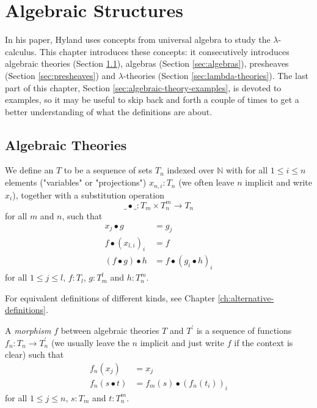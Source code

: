 \chapter{Algebraic Structures}\label{ch:algebraic-structures}

In his paper, Hyland uses concepts from universal algebra to study the $ \lambda $-calculus. This chapter introduces these concepts: it consecutively introduces algebraic theories (Section \ref{sec:algebraic-theories}), algebras (Section \ref{sec:algebras}), presheaves (Section \ref{sec:presheaves}) and $ \lambda $-theories (Section \ref{sec:lambda-theories}). The last part of this chapter, Section \ref{sec:algebraic-theory-examples}, is devoted to examples, so it may be useful to skip back and forth a couple of times to get a better understanding of what the definitions are about.

\section{Algebraic Theories}\label{sec:algebraic-theories}

\begin{definition}
  We define an  $ T $ to be a sequence of sets $ T_n $ indexed over $ \mathbb N $ with for all $ 1 \leq i \leq n $ elements ("variables" or "projections") $ x_{n, i}: T_n $ (we often leave $ n $ implicit and write $ x_i $), together with a substitution operation
  \[ \_ \bullet \_: T_m \times T_n^m \to T_n \]
  for all $ m $ and $ n $, such that
  \begin{align*}
    x_j \bullet g &= g_j\\
    f \bullet (x_{l, i})_i &= f\\
    (f \bullet g) \bullet h &= f \bullet (g_i \bullet h)_i
  \end{align*}
  for all $ 1 \leq j \leq l $, $ f: T_l $, $ g: T_m^l $ and $ h: T_n^m $.
\end{definition}

\begin{remark}
  For equivalent definitions of different kinds, see Chapter \ref{ch:alternative-definitions}.
\end{remark}

\begin{definition}
  A \textit{morphism} $ f $ between algebraic theories $ T $ and $ T^\prime $ is a sequence of functions $ f_n: T_n \to T^\prime_n $ (we usually leave the $ n $ implicit and just write $ f $ if the context is clear) such that
  \begin{align*}
    f_n(x_j) &= x_j\\
    f_n(s \bullet t) &= f_m(s) \bullet (f_n(t_i))_i
  \end{align*}
  for all $ 1 \leq j \leq n $, $ s: T_m $ and $ t: T_n^m $.
\end{definition}

